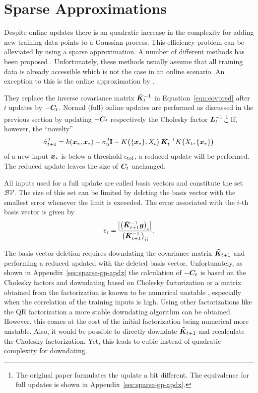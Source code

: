 \section{Sparse Approximations}
Despite online updates there is an quadratic increase in the complexity for 
adding new training data points to a Gaussian process. This efficiency problem 
can be alleviated by using a sparse approximation. A number of different methods 
has been proposed \parencites[chapter~8 
in][]{Rasmussen:2006vz}{QuinoneroCandela:2005wp}. Unfortunately, these methods 
usually assume that all training data is already accessible which is not the 
case in an online scenario. An exception to this is the online approximation by 
\textcite{Csato:2002fp}.

They replace the inverse covariance matrix $\tilde{\bm{K}}_t^{-1}$ in 
Equation~\ref{eqn:covpred} after $t$ updates by $-\bm{C}_t$. Normal (full) 
online updates are performed as discussed in the previous section by updating 
$-\bm{C}_t$ respectively the Cholesky factor $\bm{L}_t^{-1}$.\footnote{The 
    original paper formulates the update a bit different. The equivalence for 
    full updates is shown in Appendix~\ref{sec:sparse-gp-apdx}.} If, however, 
the ``novelty''
\begin{equation}
    \tilde{\sigma}^2_{t+1} = k(\vc x_*, \vc x_*) + \sigma\ped{n}^2 
    \mat{\mathrm{I}} - K\!\del{\{\vc x_*\}, X_t} \tilde{\mat K}_t^{-1} 
    K\!\del{X_t, \{\vc x_*\}}
\end{equation}
of a new input $\bm{x}_*$ is below a threshold $\epsilon_{\mathrm{tol}}$, a reduced 
update will be performed. The reduced update leaves the size of $\bm{C}_t$ 
unchanged.

All inputs used for a full update are called basis vectors and constitute the 
set~$\mathcal{BV}$. The size of this set can be limited by deleting the basis 
vector with the smallest error whenever the limit is exceeded. The error 
associated with the $i$-th basis vector is given by
\begin{equation}
    e_i = \frac{\abs[1]{\del[1]{\tilde{\mat K}_{t+1}^{-1} 
                \vc{y}}_i}}{\del[1]{\tilde{\mat{K}}_{t+1}^{-1}}_{ii}} \text{.}
\end{equation}

The basis vector deletion requires downdating the covariance matrix 
$\tilde{\bm{K}}_{t+1}$ and performing a reduced updated with the deleted basis 
vector. Unfortunately, as shown in Appendix~\ref{sec:sparse-gp-apdx} the 
calculation of $-\bm{C}_t$ is based on the Cholesky factors and downdating based 
on Cholesky factorization or a matrix obtained from the factorization is known 
to be numerical unstable \parencite{Bjorck:1994dz}, especially when the 
correlation of the training inputs is high. Using other factorizations like the 
QR factorization a more stable downdating algorithm can be obtained.  However, 
this comes at the cost of the initial factorization being numerical more 
unstable.  Also, it would be possible to directly downdate 
$\tilde{\bm{K}}_{t+1}$ and recalculate the Cholesky factorization. Yet, this 
leads to cubic instead of quadratic complexity for downdating.

